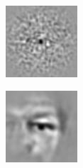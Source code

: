 \documentclass{article}
\begin{document}
\begin{figure}[h!]
\begin{subfigure}[b]{0.1\textwidth}
    \end{subfigure}
    \hspace{-1\baselineskip}
    \vspace{-0.5\baselineskip}
    \quad
    \begin{subfigure}[b]{0.1\textwidth}  
        \centering 
        \includegraphics[width=\textwidth]{plots/B_lin_R2_template.jpg}

    \end{subfigure}
    \hspace{-1\baselineskip}
    \quad
    \begin{subfigure}[b]{0.1\textwidth}   
        \centering 
        \includegraphics[width=\textwidth]{plots/C_lin_R2_template.jpg}


\end{subfigure}
\end{figure}
\end{document}
